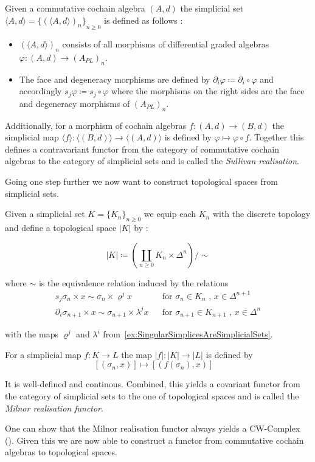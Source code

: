  \begin{Definition}
  Given a commutative cochain algebra $(A,d)$ the simplicial set 
  $\langle A , d \rangle = {\lbrace (\langle A , d \rangle)_n \rbrace}_{n \geq 0}$ is defined as follows : \\
  \begin{itemize}
   \item $(\langle A,d \rangle)_n$ consists of all morphisms of differential graded algebras 
   $\varphi \colon (A,d) \to (A_{PL})_n$.
  \item The face and degeneracy morphisms are defined by $\partial_i \varphi \coloneqq \partial_i \circ \varphi$ and
  accordingly ${s_j \varphi \coloneqq s_j \circ \varphi}$ where the morphisms on the right sides are the face and degeneracy
  morphisms of $(A_{PL})_n$.
  \end{itemize}

  Additionally, for a morphism of cochain algebras ${f \colon (A,d) \to (B,d)}$ the simplicial map
  ${\langle f \rangle \colon \langle (B,d) \rangle \to \langle (A,d) \rangle}$ is defined by
  ${\varphi \mapsto \varphi \circ f}$. \newline
  Together this defines a contravariant functor from the category of commutative cochain algebras to the category of simplicial sets
  and is called the \emph{Sullivan realisation}.
 \end{Definition}

 Going one step further we now want to construct topological spaces from simplicial sets.
 
 \begin{Definition}
  Given a simplicial set $K = {\lbrace K_n \rbrace}_{n \geq 0}$ we equip each $K_n$ 
  with the discrete topology and define a topological space $|K|$ by :
  
  $$|K| \coloneqq (\coprod_{n \geq 0} K_n \times \Delta^n) / \sim$$
  
  where $\sim$ is the equivalence relation induced by the relations
  \begin{align*}
   s_j \sigma_n \times x \sim \sigma_n \times \varrho^j x & & \text{for $\sigma_n \in K_n$ , $x \in \Delta^{n+1}$} \\
   \partial_i \sigma_{n+1} \times x \sim \sigma_{n+1} \times \lambda^j x & & \text{for $\sigma_{n+1} \in K_{n+1}$ , $x \in \Delta^n$}
  \end{align*}

   
  with the maps $\varrho^j$ and $\lambda^i$ from~\ref{ex:SingularSimplicesAreSimplicialSets}.
  
  For a simplicial map $f \colon K \to L$ the map $|f| \colon |K| \to |L|$ is defined by
  $$ [(\sigma_n , x)] \mapsto [(f(\sigma_n) , x)] \quad $$
  
  It is well-defined and continous.
  Combined, this yields a covariant functor from the category of simplicial sets to the one of topological spaces and
  is called the \emph{Milnor realisation functor}.
 \end{Definition}
 One can show that the Milnor realisation functor always yields a CW-Complex (\cite{Milnor1957}).
 Given this we are now able to construct a functor from commutative cochain algebras to topological spaces.
 
